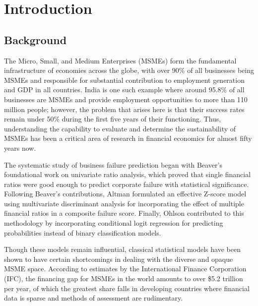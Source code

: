 \documentclass[12pt,a4paper]{report}
\begin{document}
\newpage
{}


\chapter{Introduction}

\section{Background}

The Micro, Small, and Medium Enterprises (MSMEs) form the fundamental infrastructure of economies across the globe, with over 90\% of all businesses being MSMEs and responsible for substantial contribution to employment generation and GDP in all countries. India is one such example where around 95.8\% of all businesses are MSMEs and provide employment opportunities to more than 110 million people; however, the problem that arises here is that their success rates remain under 50\% during the first five years of their functioning. Thus, understanding the capability to evaluate and determine the sustainability of MSMEs has been a critical area of research in financial economics for almost fifty years now.

The systematic study of business failure prediction began with Beaver's foundational work on univariate ratio analysis, which proved that single financial ratios were good enough to predict corporate failure with statistical significance. Following Beaver's contributions, Altman formulated an effective Z-score model using multivariate discriminant analysis for incorporating the effect of multiple financial ratios in a composite failure score. Finally, Ohlson contributed to this methodology by incorporating conditional logit regression for predicting probabilities instead of binary classification models.

Though these models remain influential, classical statistical models have been shown to have certain shortcomings in dealing with the diverse and opaque MSME space. According to estimates by the International Finance Corporation (IFC), the financing gap for MSMEs in the world amounts to over \$5.2 trillion per year, of which the greatest share falls in developing countries where financial data is sparse and methods of assessment are rudimentary.
\end{document}

